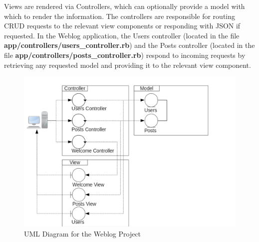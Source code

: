 \documentclass[10pt]{article}
\begin{document}
  Views are rendered via Controllers, which can optionally provide a model with which to render the information. The controllers are responsible for routing CRUD requests to the relevant view components or responding with JSON if requested. In the Weblog application, the Users controller (located in the file \textbf{app/controllers/users\_controller.rb}) and the Posts controller (located in the file \textbf{app/controllers/posts\_controller.rb}) respond to incoming requests by retrieving any requested model and providing it to the relevant view component.


  \begin{landscape}
      \begin{figure}
        \centering
          \includegraphics[height=\textheight]{uml.png}
        \caption{UML Diagram for the Weblog Project}
        \label{fig:gull}
      \end{figure}
  \end{landscape}
\end{document}
